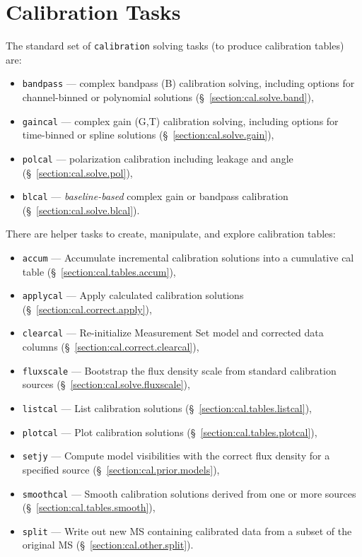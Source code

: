 \section{Calibration Tasks}
\label{section:cal.tasks}

The standard set of {\tt calibration} solving tasks (to produce
calibration tables) are:
\begin{itemize}
   \item {\tt bandpass} --- complex bandpass (B) calibration solving,
      including options for channel-binned or polynomial solutions
      (\S~\ref{section:cal.solve.band}),
   \item {\tt gaincal} --- complex gain (G,T) calibration solving, 
      including options for time-binned or spline solutions
      (\S~\ref{section:cal.solve.gain}),
   \item {\tt polcal} --- polarization calibration including leakage
      and angle
      (\S~\ref{section:cal.solve.pol}),
   \item {\tt blcal} --- {\it baseline-based} complex gain or bandpass
      calibration
      (\S~\ref{section:cal.solve.blcal}).
\end{itemize}

There are helper tasks to create, manipulate, and explore calibration 
tables:
\begin{itemize}
   \item {\tt accum} --- Accumulate incremental calibration solutions
      into a cumulative cal table (\S~\ref{section:cal.tables.accum}),
   \item {\tt applycal} --- Apply calculated calibration solutions
      (\S~\ref{section:cal.correct.apply}),
   \item {\tt clearcal} --- Re-initialize Measurement Set model
     and corrected data columns (\S~\ref{section:cal.correct.clearcal}),
   \item {\tt fluxscale} --- Bootstrap the flux density scale from
      standard calibration sources (\S~\ref{section:cal.solve.fluxscale}), 
   \item {\tt listcal} --- List calibration solutions 
      (\S~\ref{section:cal.tables.listcal}),
   \item {\tt plotcal} --- Plot calibration solutions 
      (\S~\ref{section:cal.tables.plotcal}),
    \item {\tt setjy} --- Compute model visibilities with the correct
      flux density for a specified source
      (\S~\ref{section:cal.prior.models}),
   \item {\tt smoothcal} --- Smooth calibration solutions derived from
      one or more sources (\S~\ref{section:cal.tables.smooth}),
   \item {\tt split} --- Write out new MS containing calibrated data
      from a subset of the original MS (\S~\ref{section:cal.other.split}).
\end{itemize}

